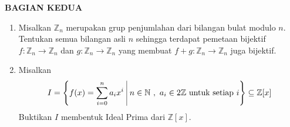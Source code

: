 \documentclass[12pt,twoside]{article}
\begin{document}
\newpage \textbf{BAGIAN KEDUA}
\begin{enumerate}
	\item Misalkan $\mathbb{Z}_n$ merupakan grup penjumlahan dari bilangan bulat modulo $n$. Tentukan semua bilangan asli $n$ sehingga terdapat pemetaan bijektif $f : \mathbb{Z}_n \to \mathbb{Z}_n$ dan $g : \mathbb{Z}_n \to \mathbb{Z}_n$ yang membuat $f+g : \mathbb{Z}_n \to \mathbb{Z}_n$ juga bijektif.

	\item Misalkan
	      \begin{equation*}
		      I = \left\lbrace f(x) = \displaystyle\sum_{i=0}^{n} a_ix^i~  \vline ~ n \in \mathbb{N}~,~ a_i \in 2\mathbb{Z} \text{ untuk setiap } i \right\rbrace \subseteq \mathbb{Z}[x]
	      \end{equation*}
	      Buktikan $I$ membentuk Ideal Prima dari $\mathbb{Z}[x]$.
\end{enumerate}

\pagebreak
\end{document}
